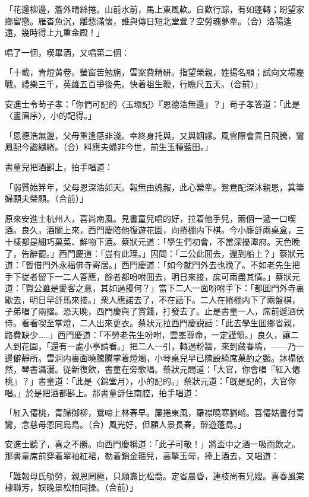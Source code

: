 「花邊柳邊，簷外晴絲捲。山前水前，馬上東風軟。自歎行踪，有如蓬轉；盼望家鄉留戀。雁杳魚沉，離愁滿懷，誰與傳日短北堂萱？空勞魂夢牽。（合）洛陽遙遠，幾時得上九重金殿！」

唱了一個，喫畢酒，又唱第二個：

「十載，青燈黄卷。螢窗苦勉旃，雪案費精硏。指望榮親，姓揚名顯；試向文場鏖戰。禮樂三千，英雄五百爭後先。快着祖生鞭，行瞻尺五天。（合前）」

安進士令苟子孝：「你們可記的〈玉環記〉『恩德浩無邊』？」苟子孝答道：「此是〈畫眉序〉，小的記得。」

「恩德浩無邊，父母重逢感非淺。幸終身托與，又與姻緣。風雲際會異日飛騰，鸞鳳配今諧繾綣。（合）料應夫婦非今世，前生玉種藍田。」

書童兒把酒斟上，拍手唱道：

「弱質始笄年，父母恩深浩如天。報無由媿赧，此心縈牽。鴛鴦配深沐親恩，箕箒婦願夫榮顯。（合前）」

原來安進士杭州人，喜尚南風。見書童兒唱的好，拉着他手兒，兩個一遞一口喫酒。良久，酒闌上來，西門慶陪他復遊花園，向捲棚内下棋。今小廝㧱兩桌盒，三十樣都是細巧菓菜、鮮物下酒。蔡狀元道：「學生們初會，不當深擾潭府。天色晚了，告辭罷。」西門慶道：「豈有此理。」因問：「二公此囬去，還到船上？」蔡狀元道：「暫借門外永福佛寺寄居。」西門慶道：「如今就門外去也晚了。不如老先生把手下従者留下一二人答應，餘者都吩咐囬去，明日來接，庶可兩盡其情。」蔡狀元道：「賢公雖是愛客之意，其如過擾何？」當下二人一面吩咐手下：「都囬門外寺裏歇去，明日早㧱馬來接。」衆人應諾去了，不在話下。二人在捲棚内下了兩盤棋，子弟唱了兩摺。恐天晚，西門慶與了賞錢，打發去了。止是書童一人，席前遞酒伏侍。看看喫至掌燈，二人出來更衣。蔡狀元拉西門慶説話：「此去學生囬鄉省親，路費缺少……」西門慶道：「不勞老先生吩咐，雲峯尊命，一定謹領。」良久，讓二人到花園，「還有一處小亭請看。」把二人一引，轉過粉牆，來到藏春塢，——乃一邊僻靜所。雪洞内裏面曉騰騰掌着燈燭，小琴桌兒早已陳設綺席菓酌之䫫。牀榻依然，琴書瀟灑。従新復飲，書童在旁歌唱。蔡狀元問道：「大官，你會唱『紅入僊桃』？」書童道：「此是〈錦堂月〉，小的記的。」蔡狀元道：「旣是記的，大官你唱。」於是把酒都斟上。那書童㧱住南腔，拍手唱道：

「紅入僊桃，青歸御柳，鶯啼上林春早。簾捲東風，羅襟曉寒猶峭。喜僊姑書付青鸞，念慈母恩同烏鳥。（合）風光好，但願人景長春，醉遊蓬島。」

安進士聽了，喜之不勝。向西門慶稱道：「此子可敬！」將盃中之酒一吸而飲之。那書童席前穿着翠袖紅裙，勒着銷金箍兒，高擎玉斝，捧上酒去，又唱道：

「難報母氏劬勞，親恩罔極，只願壽比松喬。定省晨昏，連枝尚有兄嫂。喜春風棠棣聯芳，娱晚景松柏同操。（合前）」

